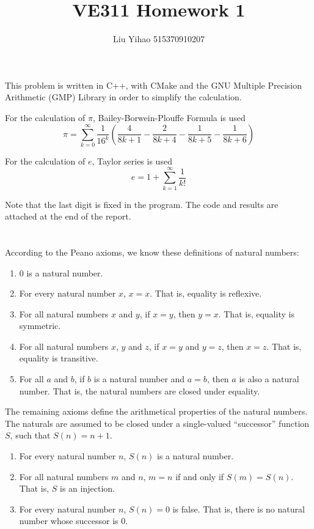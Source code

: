 \documentclass{article}
\title{VE311 Homework 1}
\author{Liu Yihao 515370910207}
\date{}
\begin{document}
\maketitle

\section{}

This problem is written in C++, with CMake and the GNU Multiple Precision Arithmetic (GMP) Library in order to simplify the calculation.

For the calculation of $\pi$, Bailey-Borwein-Plouffe Formula is used
$$\pi=\sum_{k=0}^\infty\frac{1}{16^k}\left(\frac{4}{8k+1}-\frac{2}{8k+4}-\frac{1}{8k+5}-\frac{1}{8k+6}\right)$$

For the calculation of $e$, Taylor series is used
$$e=1+\sum_{k=1}^\infty\frac{1}{k!}$$

Note that the last digit is fixed in the program. The code and results are attached at the end of the report.

\section{}

According to the Peano axioms, we know these definitions of natural numbers:
\begin{enumerate}
\item 0 is a natural number.
\item For every natural number $x$, $x = x$. That is, equality is reflexive.
\item For all natural numbers $x$ and $y$, if $x = y$, then $y = x$. That is, equality is symmetric.
\item For all natural numbers $x$, $y$ and $z$, if $x = y$ and $y = z$, then $x = z$. That is, equality is transitive.
\item For all $a$ and $b$, if $b$ is a natural number and $a = b$, then $a$ is also a natural number. That is, the natural numbers are closed under equality.
\end{enumerate}

The remaining axioms define the arithmetical properties of the natural numbers. The naturals are assumed to be closed under a single-valued ``successor'' function $S$, such that $S(n) = n+1$.
\begin{enumerate}
\item For every natural number $n$, $S(n)$ is a natural number.
\item For all natural numbers $m$ and $n$, $m = n$ if and only if $S(m) = S(n)$. That is, $S$ is an injection.
\item For every natural number $n$, $S(n) = 0$ is false. That is, there is no natural number whose successor is 0.
\end{enumerate}
\end{document}
